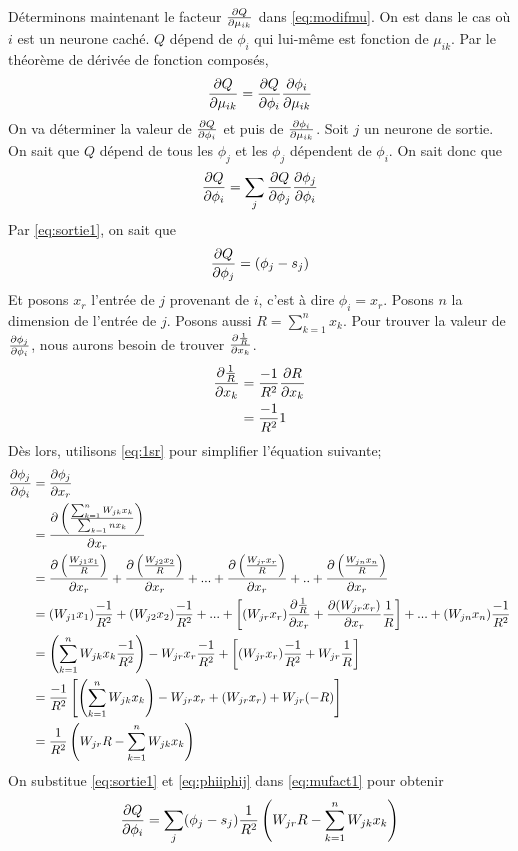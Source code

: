 Déterminons maintenant le facteur $\frac{\partial Q}{\partial \mu_{ik}}$ dans \eqref{eq:modifmu}. On est dans le cas où $i$ est un neurone caché.
$Q$ dépend de $\phi_i$ qui lui-même est fonction de $\mu_{ik}$. Par le théorème de dérivée de fonction composés,
\begin{equation}\label{eq:composemu}
 \frac{\partial Q}{\partial \mu_{ik}} = \frac{\partial Q}{\partial \phi_i} \frac{\partial \phi_i}{\partial \mu_{ik}}
\end{equation}
On va déterminer la valeur de $\frac{\partial Q}{\partial \phi_i}$ et puis de $\frac{\partial \phi_i}{\partial \mu_{ik}}$.
Soit $j$ un neurone de sortie. On sait que $Q$ dépend de tous les $\phi_j$ et les $\phi_j$ dépendent de $\phi_i$. On sait donc que
\begin{equation}\label{eq:mufact1}
 \frac{\partial Q}{\partial \phi_i} = \sum_{j} \frac{\partial Q}{\partial \phi_j}\frac{\partial \phi_j}{\partial \phi_i}
\end{equation}
Par \eqref{eq:sortie1}, on sait que
\[\frac{\partial Q}{\partial \phi_j} = (\phi_j - s_j)\]
Et posons $x_r$ l'entrée de $j$ provenant de $i$, c'est à dire $\phi_i = x_r$.
Posons $n$ la dimension de l'entrée de $j$.
Posons aussi $R = \sum_{k=1}^{n}x_k$.
Pour trouver la valeur de $\frac{\partial \phi_j}{\partial \phi_i}$, nous aurons besoin de trouver $\frac{\partial \frac{1}{R}}{\partial x_k}$.
\begin{equation}\label{eq:1sr}
 \begin{split}
 \frac{\partial \frac{1}{R}}{\partial x_k} & = \frac{-1}{R^2}\frac{\partial R}{\partial x_k}\\
 ~ & = \frac{-1}{R^2} 1
 \end{split}
\end{equation}
Dès lors, utilisons \eqref{eq:1sr} pour simplifier l'équation suivante;
\begin{equation}\label{eq:phiiphij}
 \begin{split}
 \frac{\partial \phi_j}{\partial \phi_i} & = \frac{\partial \phi_j}{\partial x_r}\\
 ~ & = \frac{\partial \left(\frac{\sum_{k=1}^{n}W_{jk}x_k}{\sum_{k=1}{n}x_k}\right)}{\partial x_r}\\
 ~ & = \frac{\partial \left(\frac{W_{j1}x_1}{R}\right)}{\partial x_r} + \frac{\partial \left(\frac{W_{j2}x_2}{R}\right)}{\partial x_r} + ... + \frac{\partial \left(\frac{W_{jr}x_r}{R}\right)}{\partial x_r} + .. + \frac{\partial \left(\frac{W_{jn}x_n}{R}\right)}{\partial x_r}\\
 ~ & = (W_{j1}x_1)\frac{-1}{R^2} + (W_{j2}x_2)\frac{-1}{R^2} + ... + \left[(W_{jr}x_r)\frac{\partial \frac{1}{R}}{\partial x_r}+\frac{\partial (W_{jr}x_r)}{\partial x_r}\frac{1}{R}\right] + ... + (W_{jn}x_n)\frac{-1}{R^2}\\
 ~ & = \left(\sum_{k=1}^{n}W_{jk}x_k\frac{-1}{R^2}\right)-W_{jr}x_r\frac{-1}{R^2} + \left[(W_{jr}x_r)\frac{-1}{R^2}+W_{jr}\frac{1}{R}\right]\\
 ~ & = \frac{-1}{R^2} \left[\left(\sum_{k=1}^{n}W_{jk}x_k\right)-W_{jr}x_r + (W_{jr}x_r) + W_{jr}(-R)\right]\\
 ~ & = \frac{1}{R^2} \left(W_{jr}R - \sum_{k=1}^{n}W_{jk}x_k\right)
 \end{split}
\end{equation}
On substitue \eqref{eq:sortie1} et \eqref{eq:phiiphij} dans \eqref{eq:mufact1} pour obtenir
\begin{equation}\label{eq:mufacto1}
 \frac{\partial Q}{\partial \phi_i} = \sum_{j} (\phi_j - s_j) \frac{1}{R^2} \left(W_{jr}R - \sum_{k=1}^{n}W_{jk}x_k\right)
\end{equation}


